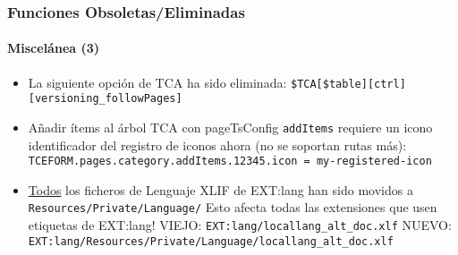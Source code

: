 \begin{frame}[fragile]
	\frametitle{Funciones Obsoletas/Eliminadas}
	\framesubtitle{Miscelánea (3)}


	\begin{itemize}

		\item La siguiente opción de TCA ha sido eliminada:\newline
			\texttt{\$TCA[\$table][ctrl][versioning\_followPages]}

		\item Añadir ítems al árbol TCA con pageTsConfig \texttt{addItems} requiere un icono identificador
			del registro de iconos ahora (no se soportan rutas más):\newline
			\smaller
				\texttt{TCEFORM.pages.category.addItems.12345.icon = my-registered-icon}
			\normalsize

		\item \underline{Todos} los ficheros de Lenguaje XLIF de EXT:lang han sido movidos a\newline
			\texttt{Resources/Private/Language/}\newline
			Esto afecta todas las extensiones que usen etiquetas de EXT:lang!\newline
			\smaller
				VIEJO: \texttt{EXT:lang/locallang\_alt\_doc.xlf}\newline
				NUEVO: \texttt{EXT:lang/Resources/Private/Language/locallang\_alt\_doc.xlf}
			\normalsize

	\end{itemize}

\end{frame}








